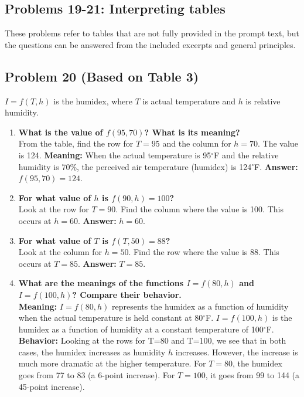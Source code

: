 \documentclass{article}
\begin{document}
\subsection{Problems 19-21: Interpreting tables}
These problems refer to tables that are not fully provided in the prompt text, but the questions can be answered from the included excerpts and general principles.

\subsection{Problem 20 (Based on Table 3)}
$I = f(T, h)$ is the humidex, where $T$ is actual temperature and $h$ is relative humidity.
\begin{enumerate}[label=\alph*.]
    \item \textbf{What is the value of $f(95, 70)$? What is its meaning?} \\
    From the table, find the row for $T=95$ and the column for $h=70$. The value is 124.
    \textbf{Meaning:} When the actual temperature is 95$^\circ$F and the relative humidity is 70\%, the perceived air temperature (humidex) is 124$^\circ$F.
    \textbf{Answer:} $f(95, 70) = 124$.
    \item \textbf{For what value of $h$ is $f(90, h) = 100$?} \\
    Look at the row for $T=90$. Find the column where the value is 100. This occurs at $h=60$.
    \textbf{Answer:} $h = 60$.
    \item \textbf{For what value of $T$ is $f(T, 50) = 88$?} \\
    Look at the column for $h=50$. Find the row where the value is 88. This occurs at $T=85$.
    \textbf{Answer:} $T = 85$.
    \item \textbf{What are the meanings of the functions $I = f(80, h)$ and $I = f(100, h)$? Compare their behavior.} \\
    \textbf{Meaning:} $I = f(80, h)$ represents the humidex as a function of humidity when the actual temperature is held constant at 80$^\circ$F. $I = f(100, h)$ is the humidex as a function of humidity at a constant temperature of 100$^\circ$F.
    \textbf{Behavior:} Looking at the rows for T=80 and T=100, we see that in both cases, the humidex increases as humidity $h$ increases. However, the increase is much more dramatic at the higher temperature. For $T=80$, the humidex goes from 77 to 83 (a 6-point increase). For $T=100$, it goes from 99 to 144 (a 45-point increase).
\end{enumerate}
\end{document}
